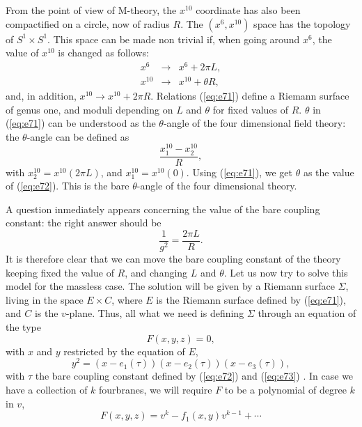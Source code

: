 From the point of view of M-theory, the $x^{10}$ coordinate has also been 
compactified on a circle, now of radius $R$. The $(x^6,x^{10})$ space has the 
topology of $S^1 \times S^1$. This space can be made non trivial if, when going 
around $x^6$, the value of $x^{10}$ is changed as follows:
\begin{eqnarray}
x^6 & \rightarrow & x^6 + 2 \pi L, \nonumber \\
x^{10}  & \rightarrow & x^{10} + \theta R,
\label{eq:e71}
\end{eqnarray}
and, in addition, $x^{10} \rightarrow x^{10} + 2 \pi R$. Relations (\ref{eq:e71}) 
define a Riemann surface of genus one, and moduli depending on $L$ and $\theta$ 
for fixed values of $R$. $\theta$ in (\ref{eq:e71}) can be understood as the 
$\theta$-angle of the four dimensional field theory: the $\theta$-angle can 
be defined as
\begin{equation}
\frac {x^{10}_1-x^{10}_2}{R},
\label{eq:e72}
\end{equation}
with $x^{10}_2=x^{10}(2 \pi L)$, and $x^{10}_1=x^{10}(0)$. Using (\ref{eq:e71}), we 
get $\theta$ as the value of (\ref{eq:e72}). This is the bare $\theta$-angle of 
the four dimensional theory.
  
A question inmediately appears concerning the value of the bare coupling 
constant: the right answer should be
\begin{equation}
\frac {1}{g^2} = \frac {2 \pi L}{R}.
\label{eq:e73}
\end{equation}
It is therefore clear that we can move the bare coupling constant of the 
theory keeping fixed the value of $R$, and changing $L$ and $\theta$. Let 
us now try to solve this model for the massless case. The solution will 
be given by a Riemann surface $\Sigma$, living in the space $E \times C$, where 
$E$ is the Riemann surface defined by (\ref{eq:e71}), and $C$ is the $v$-plane. Thus, 
all what we need is defining $\Sigma$ through an equation of the type
\begin{equation}
F(x,y,z)=0,
\label{eq:e74}
\end{equation}
with $x$ and $y$ restricted by the equation of $E$,
\begin{equation}
y^2 = (x-e_1(\tau))(x-e_2(\tau))(x-e_3(\tau)),
\label{eq:e75}
\end{equation}
with $\tau$ the bare coupling constant defined by (\ref{eq:e72}) and (\ref{eq:e73}) \cite{DW}. In case 
we have a collection of $k$ fourbranes, we will require $F$ to be a polynomial 
of degree $k$ in $v$,
\begin{equation}
F(x,y,z)=v^k-f_1(x,y)v^{k-1}+ \cdots
\label{eq:e76}
\end{equation}
  
